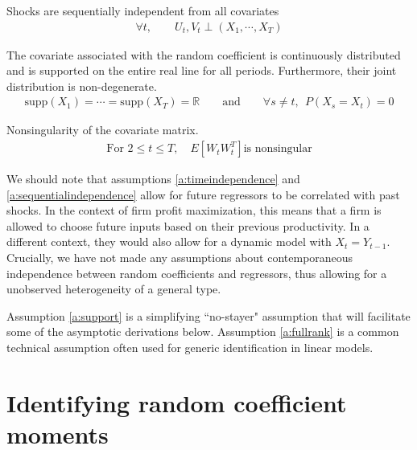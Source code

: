 \begin{assumption}{} \label{a:sequentialindependence}
  Shocks are sequentially independent from all covariates
  \begin{align}
    \forall t, \qquad U_t, V_t \perp (X_{1}, \cdots, X_{T})
  \end{align}
\end{assumption}


\begin{assumption}{}  \label{a:support}
  The covariate associated with the random coefficient is continuously distributed and is supported on the entire real line for all periods. Furthermore, their joint distribution is non-degenerate.
  \begin{align}
    \text{supp}(X_1) = \cdots = \text{supp}(X_T) = \mathbb{R} \qquad \text{and} \qquad \forall s \neq t, \ \ P(X_s = X_t) = 0 
  \end{align}
\end{assumption}

\begin{assumption}{}  \label{a:fullrank}
  Nonsingularity of the covariate matrix.
  \begin{align}
    \text{For }2 \leq t \leq T ,
    \quad     
    E[W_tW_t^{T}] \text{is nonsingular}
  \end{align}
\end{assumption}


We should note that assumptions \ref{a:timeindependence} and \ref{a:sequentialindependence} allow for future regressors to be correlated with past shocks. In the context of firm profit maximization, this means that a firm is allowed to choose future inputs based on their previous productivity. In a different context, they would also allow for a dynamic model with $X_t = Y_{t-1}$. Crucially, we have not made any assumptions about contemporaneous independence between random coefficients and regressors, thus allowing for a unobserved heterogeneity of a general type.

Assumption \ref{a:support} is a simplifying ``no-stayer" assumption that will facilitate some of the asymptotic derivations below. Assumption \ref{a:fullrank} is a common technical assumption often used for generic identification in linear models.

\section{Identifying random coefficient moments}

